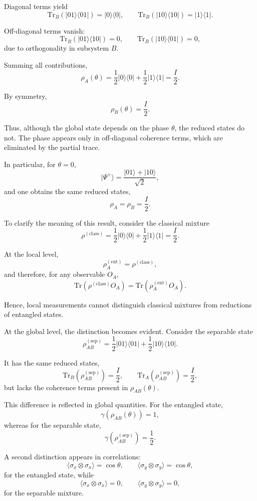 \documentclass[a4paper]{article}
\begin{document}
Diagonal terms yield
\[
\mathrm{Tr}_B(|01\rangle\langle 01|) = |0\rangle\langle 0|,
\qquad
\mathrm{Tr}_B(|10\rangle\langle 10|) = |1\rangle\langle 1|.
\]

Off-diagonal terms vanish:
\[
\mathrm{Tr}_B(|01\rangle\langle 10|) = 0,
\qquad
\mathrm{Tr}_B(|10\rangle\langle 01|) = 0,
\]
due to orthogonality in subsystem \(B\).

Summing all contributions,
\[
\rho_A(\theta)
=
\frac{1}{2}|0\rangle\langle 0|
+
\frac{1}{2}|1\rangle\langle 1|
=
\frac{I}{2}.
\]

By symmetry,
\[
\rho_B(\theta) = \frac{I}{2}.
\]

Thus, although the global state depends on the phase \( \theta \), the reduced states do not. The phase appears only in off-diagonal coherence terms, which are eliminated by the partial trace.

In particular, for \( \theta = 0 \),
\[
|\Psi^+\rangle = \frac{|01\rangle + |10\rangle}{\sqrt{2}},
\]
and one obtains the same reduced states,
\[
\rho_A = \rho_B = \frac{I}{2}.
\]


To clarify the meaning of this result, consider the classical mixture
\[
\rho^{(\mathrm{class})}
=
\frac{1}{2}|0\rangle\langle 0|
+
\frac{1}{2}|1\rangle\langle 1|
=
\frac{I}{2}.
\]

At the local level,
\[
\rho_A^{(\mathrm{ent})} = \rho^{(\mathrm{class})},
\]
and therefore, for any observable \(O_A\),
\[
\mathrm{Tr}(\rho^{(\mathrm{class})} O_A)
=
\mathrm{Tr}(\rho_A^{(\mathrm{ent})} O_A).
\]

Hence, local measurements cannot distinguish classical mixtures from reductions of entangled states.

At the global level, the distinction becomes evident. Consider the separable state
\[
\rho_{AB}^{(\mathrm{sep})}
=
\frac{1}{2}|01\rangle\langle 01|
+
\frac{1}{2}|10\rangle\langle 10|.
\]

It has the same reduced states,
\[
\mathrm{Tr}_B(\rho_{AB}^{(\mathrm{sep})}) = \frac{I}{2},
\qquad
\mathrm{Tr}_A(\rho_{AB}^{(\mathrm{sep})}) = \frac{I}{2},
\]
but lacks the coherence terms present in \( \rho_{AB}(\theta) \).

This difference is reflected in global quantities. For the entangled state,
\[
\gamma(\rho_{AB}(\theta)) = 1,
\]
whereas for the separable state,
\[
\gamma(\rho_{AB}^{(\mathrm{sep})}) = \frac{1}{2}.
\]

A second distinction appears in correlations:
\[
\langle \sigma_x \otimes \sigma_x \rangle = \cos\theta, \qquad
\langle \sigma_y \otimes \sigma_y \rangle = \cos\theta,
\]
for the entangled state, while
\[
\langle \sigma_x \otimes \sigma_x \rangle = 0, \qquad
\langle \sigma_y \otimes \sigma_y \rangle = 0,
\]
for the separable mixture.
\end{document}
